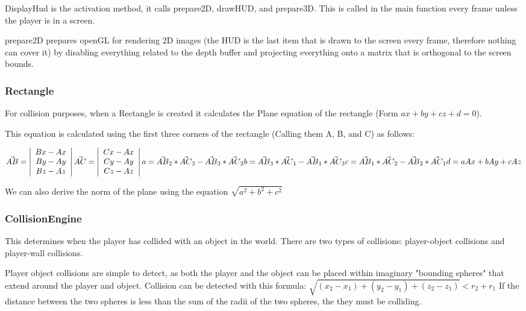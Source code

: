 \documentclass{article}
\begin{document}
DisplayHud is the activation method, it calls prepare2D, drawHUD, and prepare3D. This is called in the main function every frame unless the player is in a screen. 

prepare2D prepares openGL for rendering 2D images (the HUD is the last item that is drawn to the screen every frame, therefore nothing can cover it) by disabling everything related to the depth buffer and projecting everything onto a matrix that is orthogonal to the screen bounds.

\subsubsection{Rectangle} For collision purposes, when a Rectangle is created it calculates the Plane equation of the rectangle (Form $ax + by + cz + d = 0$).

This equation is calculated using the first three corners of the rectangle (Calling them A, B, and C) as follows:

\noindent
$
\vec{AB} = \left| \begin{array}{c}
	Bx - Ax \\
	By - Ay \\
	Bz - Az
 \end{array} \right|
\vec{AC} = \left| \begin{array}{c}
	Cx - Ax \\
	Cy - Ay \\
	Cz - Az
 \end{array} \right| \\
a = \vec{AB}_2 * \vec{AC}_3 - \vec{AB}_3 * \vec{AC}_2 \\
b = \vec{AB}_3 * \vec{AC}_1 - \vec{AB}_1 * \vec{AC}_3 \\
c = \vec{AB}_1 * \vec{AC}_2 - \vec{AB}_2 * \vec{AC}_1 \\
d = aAx + bAy + cAz
$

We can also derive the norm of the plane using the equation $\sqrt{a^2 + b^2 + c^2}$

\subsubsection{CollisionEngine}
This determines when the player has collided with an object in the world. There are two types of collisions: player-object collisions and player-wall collisions.

Player object collisions are simple to detect, as both the player and the object can be placed within imaginary "bounding spheres" that extend around the player and object. Collision can be detected with this formula:
$\sqrt{(x_2 - x_1) + (y_2 - y_1) + (z_2 - z_1)} < r_2 + r_1$
If the distance between the two spheres is less than the sum of the radii of the two spheres, the they must be colliding.
\end{document}
